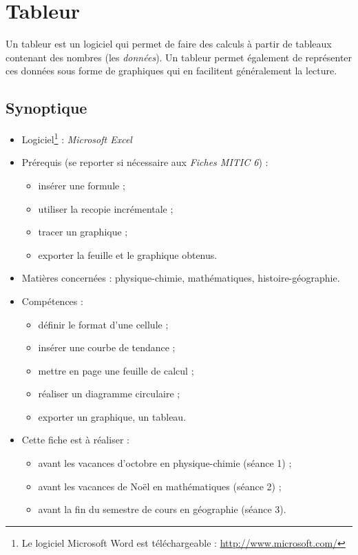 \chapter{Tableur}  

Un tableur est un logiciel qui permet de faire des calculs à partir de tableaux contenant des nombres (les \emph{données}). Un tableur permet également de représenter ces données sous forme de graphiques qui en facilitent généralement la lecture.

\section*{Synoptique}

{\footnotesize
\begin{itemize}
\item Logiciel\footnote{Le logiciel Microsoft Word est téléchargeable : \url{http://www.microsoft.com/}} : \emph{Microsoft Excel}
\item Prérequis (se reporter si nécessaire aux \emph{Fiches MITIC 6}) :
        \begin{itemize}
        \item insérer une formule ;
        \item utiliser la recopie incrémentale ;
        \item tracer un graphique ;
        \item exporter la feuille et le graphique obtenus.
        \end{itemize}
\item Matières concernées : physique-chimie, mathématiques, histoire-géographie.
\item Compétences : 
        \begin{itemize}
        \item définir le format d'une cellule ;
        \item insérer une courbe de tendance ;
        \item mettre en page une feuille de calcul ;
        \item réaliser un diagramme circulaire ;
        \item exporter un graphique, un tableau.
        \end{itemize}
\item Cette fiche est à réaliser :
        \begin{itemize}
        \item avant les vacances d'octobre en physique-chimie (séance 1) ;
        \item avant les vacances de Noël en mathématiques (séance 2) ;
        \item avant la fin du semestre de cours en géographie (séance 3). 
        \end{itemize}
\end{itemize}
}%

